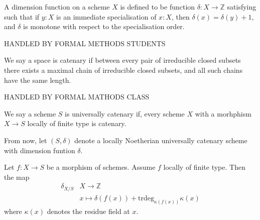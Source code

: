 %

\begin{definition}
  \label{def:dimfun}
  A dimension function on a scheme $X$ is defined to be function $\delta : X \rightarrow \mathbb{Z}$
  satisfying such that if $y : X$ is an immediate specialisation of $x : X$, then
  $\delta(x) = \delta(y) + 1$, and $\delta$ is monotone with respect to the
  specialisation order.

  HANDLED BY FORMAL METHODS STUDENTS
\end{definition}

\begin{definition}
  \label{def:catenary}
  We say a space is catenary if between every pair of irreducible closed subsets there
  exists a maximal chain of irreducible closed subsets, and all such chains have the
  same length.

  HANDLED BY FORMAL MATHODS CLASS
\end{definition}

\begin{definition}
  \label{02J7}
  We say a scheme $S$ is universally catenary if, every scheme $X$ with a morhphism
  $X \rightarrow S$ locally of finite type is catenary.
\end{definition}

From now, let $(S, \delta)$ denote a locally Noetherian universally catenary scheme
with dimension funtion $\delta$.


\begin{theorem}
  \label{02JW}
  Let $f:X \rightarrow S$ be a morphism of schemes.
  Assume $f$ locally of finite type. Then the map
  \[
  \begin{split}
  \delta_{X / S} &X \rightarrow \mathbb{Z}\\
  &x \mapsto \delta (f (x)) + \text{trdeg}_{\kappa(f(x))} \kappa (x)
  \end{split}
  \]
  where $\kappa(x)$ denotes the residue field at $x$.

\end{theorem}


